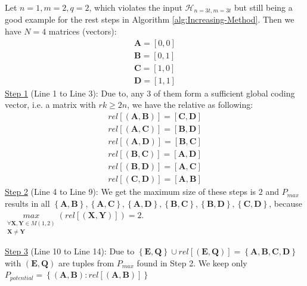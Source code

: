 \begin{example}
Let $n=1,m=2,q=2$, which violates the input $\mathcal{H}_{n=3t,m=3t}$
but still being a good example for the rest steps in Algorithm \ref{alg:Increasing-Method}.
Then we have $N=4$ matrices (vectors):
\[
\begin{array}{c}
\boldsymbol{A}=[0,0]\\
\boldsymbol{B}=[0,1]\\
\boldsymbol{C}=[1,0]\\
\boldsymbol{D}=[1,1]
\end{array}
\]
\uline{Step 1} (Line 1 to Line 3): Due to, any 3 of them form a
sufficient global coding vector, i.e. a matrix with $rk\geq2n$, we
have the relative as following:
\[
\begin{array}{c}
rel\left[\left(\boldsymbol{A},\boldsymbol{B}\right)\right]=[\boldsymbol{C},\boldsymbol{D}]\\
rel\left[\left(\boldsymbol{A},\boldsymbol{C}\right)\right]=[\boldsymbol{B},\boldsymbol{D}]\\
rel\left[\left(\boldsymbol{A},\boldsymbol{D}\right)\right]=[\boldsymbol{B},\boldsymbol{C}]\\
rel\left[\left(\boldsymbol{B},\boldsymbol{C}\right)\right]=[\boldsymbol{A},\boldsymbol{D}]\\
rel\left[\left(\boldsymbol{B},\boldsymbol{D}\right)\right]=[\boldsymbol{A},\boldsymbol{C}]\\
rel\left[\left(\boldsymbol{C},\boldsymbol{D}\right)\right]=[\boldsymbol{A},\boldsymbol{B}]
\end{array}
\]
\uline{Step 2} (Line 4 to Line 9): We get the maximum size of these
steps is $2$ and $P_{max}$ results in all $\left\{ \boldsymbol{A},\boldsymbol{B}\right\} ,\left\{ \boldsymbol{A},\boldsymbol{C}\right\} ,\left\{ \boldsymbol{A},\boldsymbol{D}\right\} ,\left\{ \boldsymbol{B},\boldsymbol{C}\right\} ,\left\{ \boldsymbol{B},\boldsymbol{D}\right\} ,\left\{ \boldsymbol{C},\boldsymbol{D}\right\} $,
because $\underset{\begin{array}{c}
\forall\boldsymbol{X},\boldsymbol{Y}\in M(1,2)\\
\boldsymbol{X}\neq\boldsymbol{Y}
\end{array}}{max}\left(rel\left[\left(\boldsymbol{X},\boldsymbol{Y}\right)\right]\right)=2$.

\uline{Step 3} (Line 10 to Line 14): Due to $\left\{ \boldsymbol{E},\boldsymbol{Q}\right\} \cup rel\left[\left(\boldsymbol{E},\boldsymbol{Q}\right)\right]=\left\{ \boldsymbol{A},\boldsymbol{B},\boldsymbol{C},\boldsymbol{D}\right\} $
with $\left(\boldsymbol{E},\boldsymbol{Q}\right)$ are tuples from
$P_{max}$ found in Step 2. We keep only $P_{potential}=\left\{ \left(\boldsymbol{A},\boldsymbol{B}\right):rel\left[\left(\boldsymbol{A},\boldsymbol{B}\right)\right]\right\} $


\end{example}
